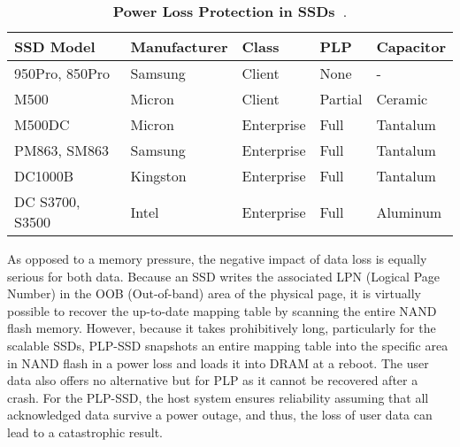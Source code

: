 \begin{table}[b]
    \centering
    \fontsize{11}{11}
    \small
    \begin{tabular}{|l|l|l|l|l|}
        \hline
        \footnotesize{\bf{SSD Model}} &
        \footnotesize{\bf{Manufacturer}} & 
        \footnotesize{\bf{Class}} &
        \footnotesize{\bf{PLP}} & 
        \footnotesize{\bf{Capacitor}} \\ \hline \hline

        \footnotesize{950Pro, 850Pro} & \footnotesize{Samsung} & \footnotesize{Client} & \footnotesize{None} & - \\ \hline
        \footnotesize{M500} & \footnotesize{Micron} & \footnotesize{Client} & \footnotesize{Partial} & \footnotesize{Ceramic} \\ \hline
        \footnotesize{M500DC} & \footnotesize{Micron} & \footnotesize{Enterprise} & \footnotesize{Full} & \footnotesize{Tantalum} \\ \hline
        \footnotesize{PM863, SM863} & \footnotesize{Samsung} & \footnotesize{Enterprise} & \footnotesize{Full} & \footnotesize{Tantalum} \\ \hline
        \footnotesize{DC1000B} & \footnotesize{Kingston} & \footnotesize{Enterprise} & \footnotesize{Full} & \footnotesize{Tantalum} \\ \hline
        \footnotesize{DC S3700, S3500} & \footnotesize{Intel} & \footnotesize{Enterprise} & \footnotesize{Full} & \footnotesize{Aluminum} \\ \hline
    \end{tabular}
    \caption{\textbf{Power Loss Protection in SSDs~\cite{micron2014, intel2014, samsungplp2016}}. 
	}
    \label{ssd_plp}
    \vspace{-20pt}
\end{table}
As opposed to a memory pressure, the negative impact of data loss is equally serious for both data. Because an SSD writes the associated LPN (Logical Page Number) in the OOB (Out-of-band) area of the physical page, it is virtually possible to recover the up-to-date mapping table by scanning the entire NAND flash memory. However, because it takes prohibitively long, particularly for the scalable SSDs, PLP-SSD snapshots an entire mapping table into the specific area in NAND flash in a power loss and loads it into DRAM at a reboot. The user data also offers no alternative but for PLP as it cannot be recovered after a crash. For the PLP-SSD, the host system ensures reliability assuming that all acknowledged data survive a power outage, and thus, the loss of user data can lead to a catastrophic result. 

